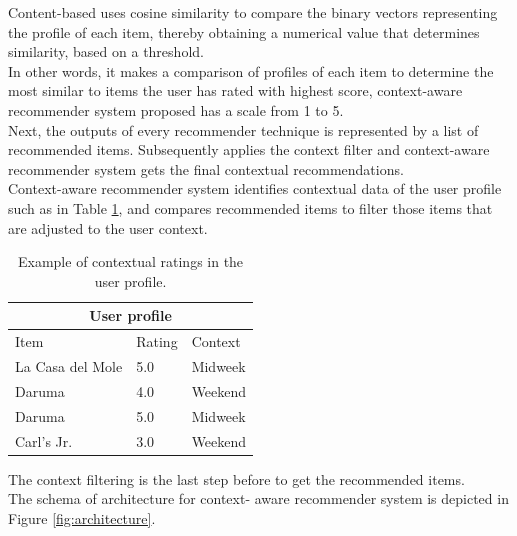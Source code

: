 Content-based uses cosine similarity to compare the binary
vectors representing the profile of each item, thereby obtaining a
numerical value that determines similarity, based on a threshold. \\   
In other words, it makes a comparison of profiles of each item to
determine the most similar to items the user has rated with highest
score, context-aware recommender system proposed has a scale 
from 1 to 5. \\
Next, the outputs of every recommender technique is represented by a
list of recommended items. Subsequently applies the context filter and
context-aware recommender system gets the final contextual
recommendations.\\  Context-aware recommender system identifies
contextual data of the user profile such as in Table  \ref{tab:2}, and
compares recommended items to filter those items that are adjusted to
the user context.  
\begin{table}[htb]
\small
\centering
\captionsetup{font=footnotesize}
\caption{Example of contextual ratings in the user profile.}
\label{tab:2}
\small
\begin{tabular}{lll}
\hline
\multicolumn{3}{c}{\textbf{User profile}} \\ \hline
Item & Rating & Context \\ \hline
La Casa del Mole & 5.0 & Midweek \\ 
Daruma           & 4.0 & Weekend \\ 
Daruma           & 5.0 & Midweek \\ 
Carl's Jr.       & 3.0 & Weekend \\ \hline
\end{tabular}
\end{table}

The context filtering is the last step before to
get the recommended items. \\The schema of architecture for context-
aware recommender system is depicted in Figure  \ref{fig:architecture}.


